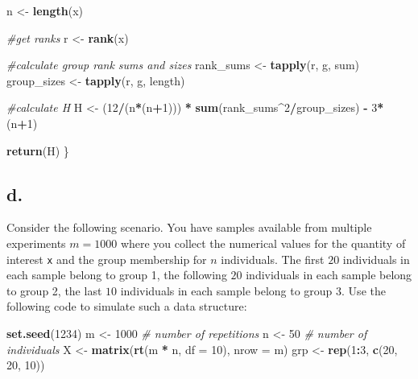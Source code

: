 \documentclass[
]{article}
\newenvironment{Shaded}{\begin{snugshade}}{\end{snugshade}}
\newcommand{\AttributeTok}[1]{\textcolor[rgb]{0.13,0.29,0.53}{#1}}
\newcommand{\CommentTok}[1]{\textcolor[rgb]{0.56,0.35,0.01}{\textit{#1}}}
\newcommand{\DecValTok}[1]{\textcolor[rgb]{0.00,0.00,0.81}{#1}}
\newcommand{\FunctionTok}[1]{\textcolor[rgb]{0.13,0.29,0.53}{\textbf{#1}}}
\newcommand{\NormalTok}[1]{#1}
\newcommand{\OtherTok}[1]{\textcolor[rgb]{0.56,0.35,0.01}{#1}}
\newcommand{\SpecialCharTok}[1]{\textcolor[rgb]{0.81,0.36,0.00}{\textbf{#1}}}
\begin{document}
\begin{Shaded}
\begin{Highlighting}[]
\NormalTok{  n }\OtherTok{\textless{}{-}} \FunctionTok{length}\NormalTok{(x)}
  
  \CommentTok{\#get ranks}
\NormalTok{  r }\OtherTok{\textless{}{-}} \FunctionTok{rank}\NormalTok{(x)}
  
  \CommentTok{\#calculate group rank sums and sizes}
\NormalTok{  rank\_sums }\OtherTok{\textless{}{-}} \FunctionTok{tapply}\NormalTok{(r, g, sum)}
\NormalTok{  group\_sizes }\OtherTok{\textless{}{-}} \FunctionTok{tapply}\NormalTok{(r, g, length)}
  
  \CommentTok{\#calculate H}
\NormalTok{  H }\OtherTok{\textless{}{-}}\NormalTok{ (}\DecValTok{12}\SpecialCharTok{/}\NormalTok{(n}\SpecialCharTok{*}\NormalTok{(n}\SpecialCharTok{+}\DecValTok{1}\NormalTok{))) }\SpecialCharTok{*} \FunctionTok{sum}\NormalTok{(rank\_sums}\SpecialCharTok{\^{}}\DecValTok{2}\SpecialCharTok{/}\NormalTok{group\_sizes) }\SpecialCharTok{{-}} \DecValTok{3}\SpecialCharTok{*}\NormalTok{(n}\SpecialCharTok{+}\DecValTok{1}\NormalTok{)}
  
  \FunctionTok{return}\NormalTok{(H)}
\NormalTok{\}}
\end{Highlighting}
\end{Shaded}

\subsection{d.~}\label{d.-3}

Consider the following scenario. You have samples available from
multiple experiments \(m=1000\) where you collect the numerical values
for the quantity of interest \texttt{x} and the group membership for
\(n\) individuals. The first \(20\) individuals in each sample belong to
group 1, the following \(20\) individuals in each sample belong to group
2, the last \(10\) individuals in each sample belong to group 3. Use the
following code to simulate such a data structure:

\begin{Shaded}
\begin{Highlighting}[]
\FunctionTok{set.seed}\NormalTok{(}\DecValTok{1234}\NormalTok{)}
\NormalTok{m }\OtherTok{\textless{}{-}} \DecValTok{1000} \CommentTok{\# number of repetitions}
\NormalTok{n }\OtherTok{\textless{}{-}} \DecValTok{50}   \CommentTok{\# number of individuals}
\NormalTok{X }\OtherTok{\textless{}{-}} \FunctionTok{matrix}\NormalTok{(}\FunctionTok{rt}\NormalTok{(m }\SpecialCharTok{*}\NormalTok{ n, }\AttributeTok{df =} \DecValTok{10}\NormalTok{), }\AttributeTok{nrow =}\NormalTok{ m)}
\NormalTok{grp }\OtherTok{\textless{}{-}} \FunctionTok{rep}\NormalTok{(}\DecValTok{1}\SpecialCharTok{:}\DecValTok{3}\NormalTok{, }\FunctionTok{c}\NormalTok{(}\DecValTok{20}\NormalTok{, }\DecValTok{20}\NormalTok{, }\DecValTok{10}\NormalTok{))}
\end{Highlighting}
\end{Shaded}
\end{document}
